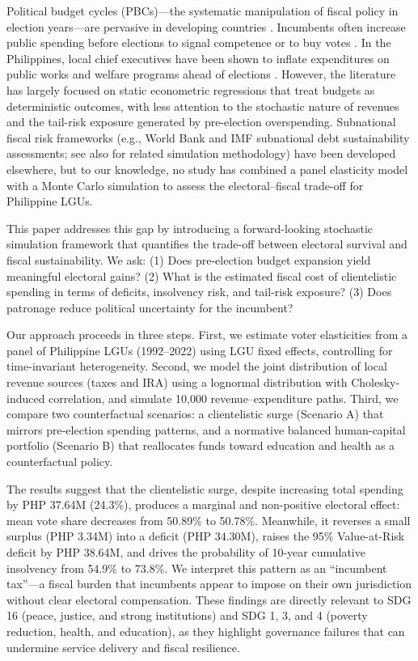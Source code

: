 \documentclass[twocolumn]{article}
\begin{document}
Political budget cycles (PBCs)---the systematic manipulation of fiscal policy in election years---are pervasive in developing countries \cite{akhmedov2004opportunistic, drazen2006electoral}. Incumbents often increase public spending before elections to signal competence or to buy votes \cite{keefer2005electoral, golden2014distributive}. In the Philippines, local chief executives have been shown to inflate expenditures on public works and welfare programs ahead of elections \cite{capuno2016patronage, llanto2016local}. However, the literature has largely focused on static econometric regressions that treat budgets as deterministic outcomes, with less attention to the stochastic nature of revenues and the tail-risk exposure generated by pre-election overspending. Subnational fiscal risk frameworks (e.g., World Bank and IMF subnational debt sustainability assessments; see also \cite{glasserman2003monte} for related simulation methodology) have been developed elsewhere, but to our knowledge, no study has combined a panel elasticity model with a Monte Carlo simulation to assess the electoral–fiscal trade-off for Philippine LGUs.

This paper addresses this gap by introducing a forward-looking stochastic simulation framework that quantifies the trade-off between electoral survival and fiscal sustainability. We ask: (1) Does pre-election budget expansion yield meaningful electoral gains? (2) What is the estimated fiscal cost of clientelistic spending in terms of deficits, insolvency risk, and tail-risk exposure? (3) Does patronage reduce political uncertainty for the incumbent?

Our approach proceeds in three steps. First, we estimate voter elasticities from a panel of Philippine LGUs (1992--2022) using LGU fixed effects, controlling for time-invariant heterogeneity. Second, we model the joint distribution of local revenue sources (taxes and IRA) using a lognormal distribution with Cholesky-induced correlation, and simulate 10,000 revenue--expenditure paths. Third, we compare two counterfactual scenarios: a clientelistic surge (Scenario A) that mirrors pre-election spending patterns, and a normative balanced human-capital portfolio (Scenario B) that reallocates funds toward education and health as a counterfactual policy.

The results suggest that the clientelistic surge, despite increasing total spending by PHP 37.64M (24.3\%), produces a marginal and non-positive electoral effect: mean vote share decreases from 50.89\% to 50.78\%. Meanwhile, it reverses a small surplus (PHP 3.34M) into a deficit (PHP 34.30M), raises the 95\% Value-at-Risk deficit by PHP 38.64M, and drives the probability of 10-year cumulative insolvency from 54.9\% to 73.8\%. We interpret this pattern as an ``incumbent tax''---a fiscal burden that incumbents appear to impose on their own jurisdiction without clear electoral compensation. These findings are directly relevant to SDG 16 (peace, justice, and strong institutions) and SDG 1, 3, and 4 (poverty reduction, health, and education), as they highlight governance failures that can undermine service delivery and fiscal resilience.
\end{document}
